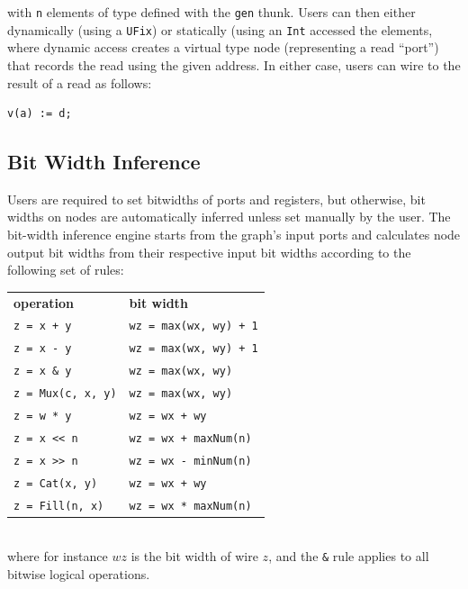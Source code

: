 \documentclass[10pt,twocolumn]{article}
\def\code#1{{\small\tt #1}}
\begin{document}
\noindent
with \code{n} elements of type defined with the \code{gen} thunk.
Users can then either dynamically (using a \code{UFix}) or statically (using
an \code{Int} accessed the elements,
where dynamic access creates a virtual type node (representing a read
``port'') that records the read using the given address.  In either case,
users can wire to the result of a read as follows:

\begin{lstlisting}
v(a) := d;
\end{lstlisting}


\subsection{Bit Width Inference}

Users are required to set bitwidths of ports and registers, but otherwise,
bit widths on nodes are automatically inferred unless set manually by the user.
The bit-width inference engine starts from the graph's input ports and 
calculates node output bit widths from their respective input bit widths according to the following set of rules:\\

{\footnotesize
\begin{tabular}{ll}
{\bf operation} & {\bf bit width} \\ 
\verb|z = x + y| & \verb|wz = max(wx, wy) + 1| \\
\verb+z = x - y+ & \verb|wz = max(wx, wy) + 1|\\
\verb+z = x & y+ & \verb+wz = max(wx, wy)+ \\
\verb+z = Mux(c, x, y)+ & \verb+wz = max(wx, wy)+ \\
\verb+z = w * y+ & \verb!wz = wx + wy! \\
\verb+z = x << n+ & \verb!wz = wx + maxNum(n)! \\
\verb+z = x >> n+ & \verb+wz = wx - minNum(n)+ \\
\verb+z = Cat(x, y)+ & \verb!wz = wx + wy! \\
\verb+z = Fill(n, x)+ & \verb+wz = wx * maxNum(n)+ \\
\end{tabular}
}
\\[1mm]
\noindent  
where for instance $wz$ is the bit width of wire $z$, and the \verb+&+
rule applies to all bitwise logical operations.
\end{document}
